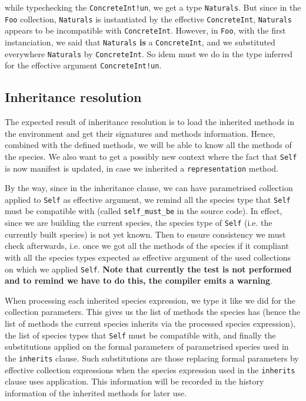 \noindent while typechecking the {\tt ConcreteInt!un}, we get a type
{\tt Naturals}. But since in the {\tt Foo} collection, {\tt Naturals} is
instantiated by the effective {\tt ConcreteInt}, {\tt Naturals} appears
to be incompatible with {\tt ConcreteInt}. However, in {\tt Foo}, with
the first instanciation, we said that {\tt Naturals} {\bf is} a
{\tt ConcreteInt}, and we substituted everywhere {\tt Naturals} by
{\tt ConcreteInt}. So idem must we do in the type inferred for the
effective argument {\tt ConcreteInt!un}.



\subsection{Inheritance resolution}
\label{inheritance-resolution}
The expected result of inheritance resolution is to load the inherited
methods in the environment and get their signatures and methods
information. Hence, combined with the defined methods, we will be able
to know all the methods of the species. We also want to get a possibly
new context where the fact that {\tt Self} is now manifest is
updated, in case we inherited a {\tt representation} method.

By the way, since in the inheritance clause, we can have parametrised
collection applied to {\tt Self} as effective argument, we remind all
the species type that {\tt Self} must be compatible with (called
{\tt self\_must\_be} in the source code). In effect, since we are
building the current species, the species type of {\tt Self} (i.e. the
currently built species) is not yet known. Then to ensure consistency
we must check afterwards, i.e. once we got all the methods of the
species if it compliant with all the species types expected as
effective argument of the used collections on which we applied
{\tt Self}.
\label{cadaver-self-must-be}
{\bf {\large Note that currently the test is not performed
and to remind we have to do this, the compiler emits a warning}}.

\medskip
When processing each inherited species expression, we type it like we
did for the collection parameters. This gives us the list of methods
the species has (hence the list of methods the current species inherits
via the processed species expression), the list of species types that
{\tt Self} must be compatible with, and finally the substitutions
applied on the formal parameters of parametrised species used in the
{\tt inherits} clause. Such substitutions are those replacing formal
parameters by effective collection expressions when the species
expression used in the {\tt inherits} clause uses application.
This information will be recorded in the history information of the
inherited methods for later use.

